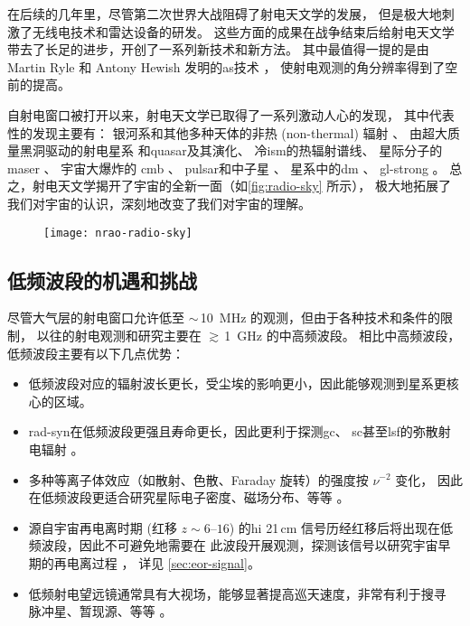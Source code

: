 在后续的几年里，尽管第二次世界大战阻碍了射电天文学的发展，
但是极大地刺激了无线电技术和雷达设备的研发。
这些方面的成果在战争结束后给射电天文学带去了长足的进步，开创了一系列新技术和新方法。
其中最值得一提的是由 Martin Ryle 和 Antony Hewish 发明的\ac{as}技术 \cite{ryle1960}，
使射电观测的角分辨率得到了空前的提高。

自射电窗口被打开以来，射电天文学已取得了一系列激动人心的发现，
其中代表性的发现主要有：
银河系和其他多种天体的非热 (non-thermal) 辐射 \cite{reber1940}、
由超大质量黑洞驱动的射电星系\cite{baade1954}
和\ac{quasar}\cite{hazard1963,schmidt1963}及其演化、
冷\ac{ism}的热辐射谱线、
星际分子的\ac{maser} \cite{weaver1965}、
宇宙大爆炸的 \ac{cmb} \cite{penzias1965}、
\ac{pulsar}和中子星 \cite{hewish1968}、
星系中的\ac{dm} \cite{roberts1975}、
\ac{gl-strong} \cite{walsh1979}。
总之，射电天文学揭开了宇宙的全新一面（如\autoref{fig:radio-sky} 所示），
极大地拓展了我们对宇宙的认识，深刻地改变了我们对宇宙的理解。

\begin{figure}[htp]
  \centering
  \texttt{[image: nrao-radio-sky]}
  \label{fig:radio-sky}
\end{figure}

\subsection{低频波段的机遇和挑战}

尽管大气层的射电窗口允许低至 $\sim$\,\SI{10}{\MHz} 的观测，但由于各种技术和条件的限制，
以往的射电观测和研究主要在 $\gtrsim$\,\SI{1}{\GHz} 的中高频波段。
相比中高频波段，低频波段主要有以下几点优势：
\begin{itemize}
  \item 低频波段对应的辐射波长更长，受尘埃的影响更小，因此能够观测到星系更核心的区域。
  \item \ac{rad-syn}在低频波段更强且寿命更长，因此更利于探测\ac{gc}、
    \ac{sc}甚至\ac{lsf}的弥散射电辐射 \cite{cassano2015,vazza2015,kale2016}。
  \item 多种等离子体效应（如散射、色散、Faraday 旋转）的强度按 $\nu^{-2}$ 变化，
    因此在低频波段更适合研究星际电子密度、磁场分布、等等
    \cite{johnston2015,roy2016,vanEck2017}。
  \item 源自宇宙再电离时期 (红移 $z \sim \numrange{6}{16}$)
    的\ac{hi} 21\,cm 信号历经红移后将出现在低频波段，因此不可避免地需要在
    此波段开展观测，探测该信号以研究宇宙早期的再电离过程
    \cite{mellema2013,mellema2015,koopmans2015}，
    详见 \autoref{sec:eor-signal}。
  \item 低频射电望远镜通常具有大视场，能够显著提高巡天速度，非常有利于搜寻
    脉冲星、暂现源、等等 \cite{stappers2011,fender2015}。
\end{itemize}

